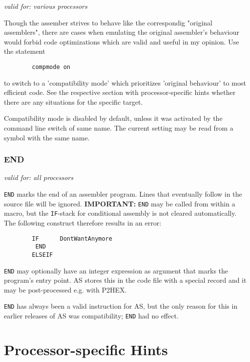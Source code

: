 \documentclass[12pt,twoside]{report}
\makeatletter
\newcommand{\bb}[1]{{\bf #1}}
\newcommand{\tty}[1]{{\tt #1}}
\newcommand{\ttindex}[1]{\index{#1@{\tt #1}}}
\makeatother
\begin{document}
{\em valid for: various processors}

Though the assember strives to behave like the correspondig "original
assemblers", there are cases when emulating the original assembler's
behaviour would forbid code optimizations which are valid and useful in
my opinion.  Use the statement
\begin{verbatim}
        compmode on
\end{verbatim}
to switch to a 'compatibility mode' which prioritizes 'original behaviour'
to most efficient code.  See the respective section with processor-specific
hints whether there are any situations for the specific target.
\par
Compatibility mode is disabled by default, unless it was activated by the
command line switch of same name.  The current setting may be read from a
symbol with the same name.


\subsection{END}
\ttindex{END}

{\em valid for: all processors}

\tty{END} marks the end of an assembler program.  Lines that eventually
follow in the source file will be ignored.  \bb{IMPORTANT:} \tty{END} may
be called from within a macro, but the \tty{IF}-stack for conditional
assembly is not cleared automatically.  The following construct therefore
results in an error:
\begin{verbatim}
        IF      DontWantAnymore
         END
        ELSEIF
\end{verbatim}
\tty{END} may optionally have an integer expression as argument that marks
the program's entry point.  AS stores this in the code file with a special
record and it may be post-processed e.g. with P2HEX.

\tty{END} has always been a valid instruction for AS, but the only reason
for this in earlier releases of AS was compatibility; \tty{END} had no
effect.


\cleardoublepage
\chapter{Processor-specific Hints}
\end{document}
